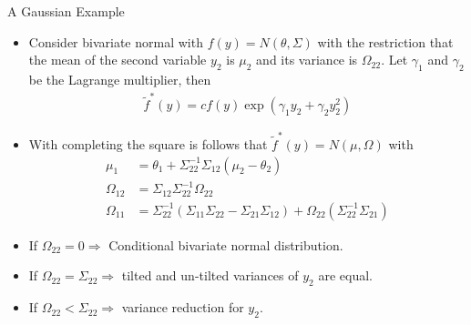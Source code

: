 \documentclass[9pt,xcolor=x11names,compress]{beamer}
\theoremstyle{standard}
\theoremstyle{notes}
\begin{document}
\begin{frame}{A Gaussian Example}
	\begin{itemize}
		\item Consider bivariate normal with $f(y)=N(\theta,\Sigma)$ with the restriction that the mean of the second variable $y_2$ is $\mu_2$ and its variance is $\Omega_{22}$. Let $\gamma_1$ and $\gamma_2$ be the Lagrange multiplier, then
		\begin{align}
		\tilde{f}^*(y)=cf(y)\exp(\gamma_1 y_2+\gamma_2 y_2^2)
		\end{align}
		\item With completing the square is follows that $\tilde{f}^*(y)=N(\mu,\Omega)$ with
		\begin{align}
		\mu_1&=\theta_1+\Sigma_{22}^{-1}\Sigma_{12}(\mu_2-\theta_2)\\
		\Omega_{12}&=\Sigma_{12}\Sigma_{22}^{-1}\Omega_{22}\\
		\Omega_{11}&=\Sigma_{22}^{-1}(\Sigma_{11}\Sigma_{22}-\Sigma_{21}\Sigma_{12})+\Omega_{22}(\Sigma_{22}^{-1}\Sigma_{21})
		\end{align}
		\item If $\Omega_{22}=0\Rightarrow$ Conditional bivariate normal distribution.
		\item If $\Omega_{22}=\Sigma_{22}\Rightarrow$ tilted and un-tilted variances of $y_2$ are equal.
		\item If $\Omega_{22}<\Sigma_{22}\Rightarrow$ variance reduction for $y_2$.
	\end{itemize}
\end{frame}
\end{document}
